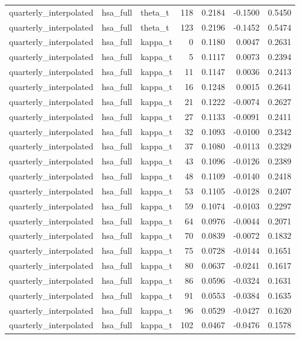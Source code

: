\begin{tabular}{lllrrrr}
quarterly\_interpolated & hsa\_full & theta\_t & 118 & 0.2184 & -0.1500 & 0.5450 \\
quarterly\_interpolated & hsa\_full & theta\_t & 123 & 0.2196 & -0.1452 & 0.5474 \\
quarterly\_interpolated & hsa\_full & kappa\_t & 0 & 0.1180 & 0.0047 & 0.2631 \\
quarterly\_interpolated & hsa\_full & kappa\_t & 5 & 0.1117 & 0.0073 & 0.2394 \\
quarterly\_interpolated & hsa\_full & kappa\_t & 11 & 0.1147 & 0.0036 & 0.2413 \\
quarterly\_interpolated & hsa\_full & kappa\_t & 16 & 0.1248 & 0.0015 & 0.2641 \\
quarterly\_interpolated & hsa\_full & kappa\_t & 21 & 0.1222 & -0.0074 & 0.2627 \\
quarterly\_interpolated & hsa\_full & kappa\_t & 27 & 0.1133 & -0.0091 & 0.2411 \\
quarterly\_interpolated & hsa\_full & kappa\_t & 32 & 0.1093 & -0.0100 & 0.2342 \\
quarterly\_interpolated & hsa\_full & kappa\_t & 37 & 0.1080 & -0.0113 & 0.2329 \\
quarterly\_interpolated & hsa\_full & kappa\_t & 43 & 0.1096 & -0.0126 & 0.2389 \\
quarterly\_interpolated & hsa\_full & kappa\_t & 48 & 0.1109 & -0.0140 & 0.2418 \\
quarterly\_interpolated & hsa\_full & kappa\_t & 53 & 0.1105 & -0.0128 & 0.2407 \\
quarterly\_interpolated & hsa\_full & kappa\_t & 59 & 0.1074 & -0.0103 & 0.2297 \\
quarterly\_interpolated & hsa\_full & kappa\_t & 64 & 0.0976 & -0.0044 & 0.2071 \\
quarterly\_interpolated & hsa\_full & kappa\_t & 70 & 0.0839 & -0.0072 & 0.1832 \\
quarterly\_interpolated & hsa\_full & kappa\_t & 75 & 0.0728 & -0.0144 & 0.1651 \\
quarterly\_interpolated & hsa\_full & kappa\_t & 80 & 0.0637 & -0.0241 & 0.1617 \\
quarterly\_interpolated & hsa\_full & kappa\_t & 86 & 0.0596 & -0.0324 & 0.1631 \\
quarterly\_interpolated & hsa\_full & kappa\_t & 91 & 0.0553 & -0.0384 & 0.1635 \\
quarterly\_interpolated & hsa\_full & kappa\_t & 96 & 0.0529 & -0.0427 & 0.1620 \\
quarterly\_interpolated & hsa\_full & kappa\_t & 102 & 0.0467 & -0.0476 & 0.1578 \\

\end{tabular}
